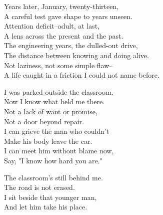 \begin{lyrics}
Years later, January, twenty-thirteen,\\
A careful test gave shape to years unseen.\\
Attention deficit--adult, at last,\\
A lens across the present and the past.\\
The engineering years, the dulled-out drive,\\
The distance between knowing and doing alive.\\
Not laziness, not some simple flaw--\\
A life caught in a friction I could not name before.

I was parked outside the classroom,\\
Now I know what held me there.\\
Not a lack of want or promise,\\
Not a door beyond repair.\\
I can grieve the man who couldn't\\
Make his body leave the car.\\
I can meet him without blame now,\\
Say, "I know how hard you are."

The classroom's still behind me.\\
The road is not erased.\\
I sit beside that younger man,\\
And let him take his place.
\end{lyrics}

